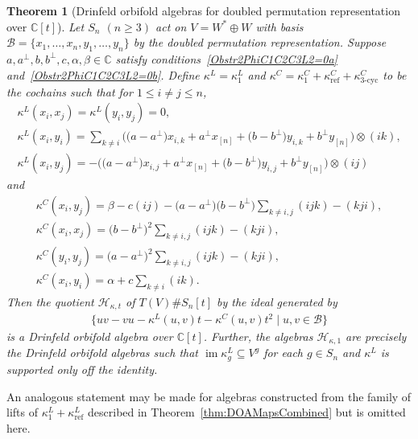 \documentclass[pdftex]{sigma}
\numberwithin{equation}{section}
\newtheorem{Theorem}{Theorem}[section]
\DeclareMathOperator{\im}{im}
\DeclareMathOperator{\refl}{ref}
\DeclareMathOperator{\tri}{3-cyc}
\begin{document}
\begin{Theorem}[{Drinfeld orbifold algebras for doubled permutation representation over $\mathbb{C}[t]$}]
\label{permexamples}
Let $S_n$ $(n \geq 3)$ act on $V=W^* \oplus W$ with basis
$\mathcal{B}=\{x_1,\dots,x_n,y_1,\dots,y_n\}$ by the doubled permutation
representation. Suppose $a,a^\perp,b,b^\perp,c,\alpha,\beta \in \mathbb{C}$ %
satisfy conditions~\eqref{Obstr2PhiC1C2C3L2=0a} and~\eqref{Obstr2PhiC1C2C3L2=0b}.
Define $\kappa^L=\kappa_1^L$ and $\kappa^C=\kappa_1^C+\kappa_{\refl}^C+\kappa_{\tri}^C$
to be the cochains such that for $1 \leq i \neq j \leq n$,
\begin{gather*}
\kappa^L(x_i,x_j)=\kappa^L(y_i,y_j)=0, \\
\kappa^L(x_i,y_i)=\textstyle\sum\limits_{k \neq i}\big( \big(a-a^\perp\big)x_{i,k}+a^\perp x_{[n]}+\big(b-b^\perp\big)y_{i,k}+b^\perp y_{[n]}\big) \otimes (ik), \\
\kappa^L(x_i,y_j)=-\big(\big(a-a^\perp\big)x_{i,j}+a^\perp x_{[n]}+\big(b-b^\perp\big)y_{i,j}+b^\perp y_{[n]}\big) \otimes (ij)
\end{gather*}
and
\begin{gather*}
\kappa^C(x_i,y_j)=\beta-c(ij)-\big(a-a^\perp\big)\big(b-b^\perp\big)\textstyle\sum\limits_{k \neq i,j} (ijk)-(kji), \\
\kappa^C(x_i,x_j)=\big(b-b^\perp\big)^2 \textstyle\sum\limits_{k \neq i,j} (ijk)-(kji), \\
\kappa^C(y_i,y_j)=\big(a-a^\perp\big)^2 \textstyle\sum\limits_{k \neq i,j} (ijk)-(kji), \\
\kappa^C(x_i,y_i)=\alpha+c\textstyle\sum\limits_{k \neq i} (ik).
\end{gather*}
Then the quotient $\mathcal{H}_{\kappa,t}$ of $T(V) \# S_n[t]$ by the ideal generated by
\begin{gather*}
\big\{uv-vu - \kappa^L(u,v) t -\kappa^C(u,v) t^2 \mid u,v \in \mathcal{B} \big\}
\end{gather*}
is a Drinfeld orbifold algebra over $\mathbb{C}[t]$.
Further, the algebras $\mathcal{H}_{\kappa,1}$ are precisely the Drinfeld orbifold
algebras such that $\im\kappa^L_g\subseteq V^g$ for each $g\in S_n$ and $\kappa^L$
is supported only off the identity.
\end{Theorem}

An analogous statement may be made for algebras constructed from the family of
lifts of $\kappa^L_1+\kappa^L_{\refl}$ described in Theorem~\ref{thm:DOAMapsCombined}
but is omitted here.
\end{document}
